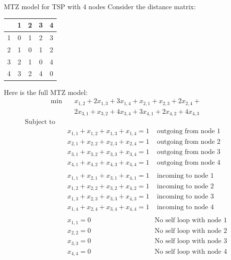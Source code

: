 \begin{example}{MTZ model for TSP with 4 nodes}{}
Consider the distance matrix:
\begin{center}
\begin{tabular}{|c|c|c|c|c|}
\hline
 & 1 & 2 & 3 & 4 \\
\hline
1 & 0 & 1 & 2 & 3 \\
\hline
2 & 1 & 0 & 1 & 2 \\
\hline
3 & 2 & 1 & 0 & 4 \\
\hline
4 & 3 & 2 & 4 & 0 \\
\hline
\end{tabular}
\end{center}

Here is the full MTZ model:
\begin{align*}\min\quad & x_{1,2} + 2 x_{1,3} + 3 x_{1,4} + x_{2,1} + x_{2,3} + 2 x_{2,4} + \\ &2 x_{3,1} + x_{3,2} + 4 x_{3,4} + 3 x_{4,1} + 2 x_{4,2} + 4 x_{4,3}
\end{align*}
\begin{align*}
\text{Subject to} \quad \\
 & x_{1,1} + x_{1,2} + x_{1,3} + x_{1,4} = 1& \text{ outgoing from node 1}\\
  & x_{2,1} + x_{2,2} + x_{2,3} + x_{2,4} = 1& \text{ outgoing from node 2}\\
 & x_{3,1} + x_{3,2} + x_{3,3} + x_{3,4} = 1& \text{ outgoing from node 3}\\
 & x_{4,1} + x_{4,2} + x_{4,3} + x_{4,4} = 1& \text{ outgoing from node 4}\\
 \\
  & x_{1,1} + x_{2,1} + x_{3,1} + x_{4,1} = 1& \text{ incoming to node 1}\\
 & x_{1,2} + x_{2,2} + x_{3,2} + x_{4,2} = 1& \text{ incoming to node 2}\\
 & x_{1,3} + x_{2,3} + x_{3,3} + x_{4,3} = 1& \text{ incoming to node 3}\\ 
 & x_{1,4} + x_{2,4} + x_{3,4} + x_{4,4} = 1& \text{ incoming to node 4}\\
 \\
 & x_{1,1} = 0 & \text{No self loop with node 1}\\
 & x_{2,2} = 0& \text{No self loop with node 2}\\
 & x_{3,3} = 0& \text{No self loop with node 3}\\
 & x_{4,4} = 0& \text{No self loop with node 4}\\
 \\

\end{align*}
\end{example}
